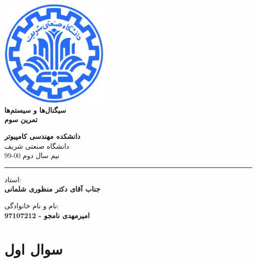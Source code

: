 \documentclass[12pt]{article}
\begin{document}
\begin{titlepage}
\begin{center}
        
\vspace*{0.7cm}

\includegraphics[width=0.4\textwidth]{sharif1.png}\\
\vspace{0.5cm}
\textbf{ \Huge{\emph ‌سیگنال‌ها و سیستم‌ها} }\\
\vspace{0.5cm}
\textbf{ \Large{ تمرین سوم} }
\vspace{0.2cm}
       
 
      \large \textbf{دانشکده مهندسی کامپیوتر}\\\vspace{0.2cm}
    \large   دانشگاه صنعتی شریف\\\vspace{0.2cm}
       \large   ﻧﯿﻢ سال دوم 00-99 \\\vspace{0.2cm}
      \noindent\rule[1ex]{\linewidth}{1pt}
استاد:\\
    \textbf{{جناب آقای دکتر منظوری شلمانی}}


    \vspace{0.15cm}
نام و نام خانوادگی:\\

       
    \textbf{{امیرمهدی نامجو - 97107212}}
\end{center}
\end{titlepage}


\newpage
\pagestyle{fancy}
\fancyhf{}
\fancyfoot{}
\cfoot{\thepage}

\KashidaOff

\section{سوال اول}
\end{document}
